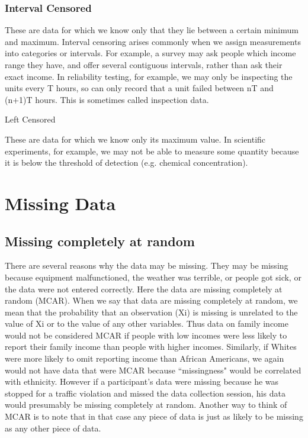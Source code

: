 \documentclass[]{article}
\begin{document}
\subsubsection{Interval Censored}

These are data for which we know only that they lie between a certain minimum and maximum. Interval censoring arises commonly when we assign measurements into categories or intervals. For example, a survey may ask people which income range they have, and offer several contiguous intervals, rather than ask their exact income. In reliability testing, for example, we may only be inspecting the units every T hours, so can only record that a unit failed between nT and (n+1)T hours. This is sometimes called inspection data.


Left Censored

These are data for which we know only its maximum value. In scientific experiments, for example, we may not be able to measure some quantity because it is below the threshold of detection (e.g. chemical concentration).


\section{Missing Data}


\subsection{Missing completely at random}
There are several reasons why the data may be missing. They may be missing because equipment malfunctioned, the weather was terrible, or people got sick, or the data were not entered correctly. Here the data are missing completely at random (MCAR). When we say that data are missing completely at random, we mean that the probability that an observation (Xi) is missing is unrelated to the value of Xi or to the value of any other variables. Thus data on family income would not be considered MCAR if people with low incomes were less likely to report their family income than people with higher incomes. Similarly, if Whites were more likely to omit reporting income than African Americans, we again would not have data that were MCAR because ``missingness" would be correlated with ethnicity. However if a participant's data were missing because he was stopped for a traffic violation and missed the data collection session, his data would presumably be missing completely at random. Another way to think of MCAR is to note that in that case any piece of data is just as likely to be missing as any other piece of data.
\end{document}
